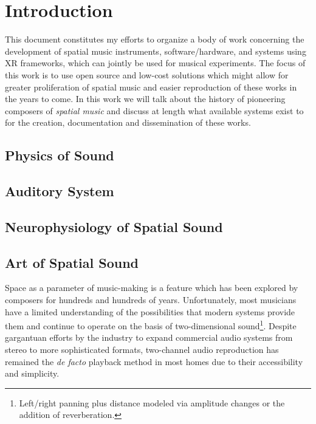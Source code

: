 \chapter{Introduction}

This document constitutes my efforts to organize a body of work concerning the development of spatial music instruments, software/hardware, and systems using XR frameworks, which can jointly be used for musical experiments. The focus of this work is to use open source and low-cost solutions which might allow for greater proliferation of spatial music and easier reproduction of these works in the years to come. In this work we will talk about the history of pioneering composers of \textit{spatial music} and discuss at length what available systems exist to for the creation, documentation and dissemination of these works.

\section{Physics of Sound}


\section{Auditory System}


\section{Neurophysiology of Spatial Sound}

\section{Art of Spatial Sound}

Space as a parameter of music-making is a feature which has been explored by composers for hundreds and hundreds of years. Unfortunately, most musicians have a limited understanding of the possibilities that modern systems provide them and continue to operate on the basis of two-dimensional sound\footnote{Left/right panning plus distance modeled via amplitude changes or the addition of reverberation.}. Despite gargantuan efforts by the industry to expand commercial audio systems from stereo to more sophisticated formats, two-channel audio reproduction has remained the \textit{de facto} playback method in most homes due to their accessibility and simplicity. 

